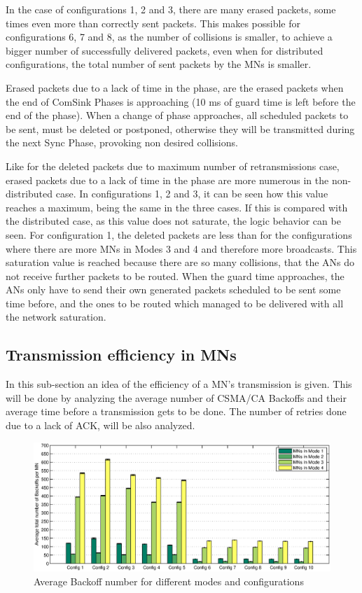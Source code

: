 In the case of configurations 1, 2 and 3, there are many erased packets, some times even more than correctly sent packets. This makes possible 
for configurations 6, 7 and 8, as the number of collisions is smaller, to achieve a bigger number of successfully delivered packets, even 
when for distributed configurations, the total number of sent packets by the \acp{MN} is smaller.

Erased packets due to a lack of time in the phase, are the erased packets when the end of ComSink Phases is approaching (10 ms of guard time is left
before the end of the phase). When a change of phase approaches, all scheduled packets to be sent, must be deleted or postponed, otherwise they will be 
transmitted during the next Sync Phase, provoking non desired collisions.

Like for the deleted packets due to maximum number of retransmissions case, erased packets due to a lack of time in the phase are more numerous in the 
non-distributed case. In configurations 1, 2 and 3, it can be seen how this value reaches a maximum, being the same in the three cases. If this 
is compared with the distributed case, as this value does not saturate, the logic behavior can be seen. For configuration 1, the deleted packets 
are less than for the configurations where there are more \acp{MN} in Modes 3 and 4 and therefore more broadcasts. This saturation value is reached 
because there are so many collisions, that the \acp{AN} do not receive further packets to be routed. When the guard time approaches, the \acp{AN} only have 
to send their own generated packets scheduled to be sent some time before, and the ones to be routed which managed to be delivered with all the 
network saturation.

\subsection{Transmission efficiency in \acp{MN}}

In this sub-section an idea of the efficiency of a \ac{MN}'s transmission is given. This will be done by analyzing the average number of \ac{CSMA/CA}
Backoffs and their average time before a transmission gets to be done. The number of retries done due to a lack of \ac{ACK}, will be also analyzed.

\begin{figure}[ht]
 \begin{center}
  \includegraphics[width=1\textwidth]{BackoffNumberInMN.eps}
 \end{center}
 \caption{Average Backoff number for different modes and configurations}
 \label{fig:BackoffNumberInMN}
\end{figure}

